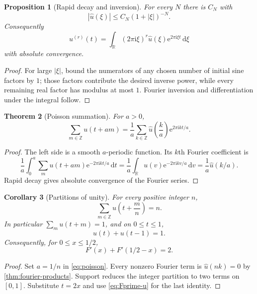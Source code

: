 \documentclass[11pt]{article}
\newtheorem{theorem}{Theorem}[section]
\newtheorem{proposition}[theorem]{Proposition}
\newtheorem{corollary}[theorem]{Corollary}
\theoremstyle{definition}
\theoremstyle{remark}
\newcommand{\R}{\mathbb R}\newcommand{\C}{\mathbb C}\newcommand{\Z}{\mathbb Z}
\newcommand{\dd}{\,\mathrm d}\newcommand{\e}{\mathrm e}\newcommand{\ii}{\mathrm i}
\begin{document}
\begin{proposition}[Rapid decay and inversion]\label{prop:rapid-decay}
For every $N$ there is $C_N$ with
\[
 |\widehat u(\xi)|\le C_N(1+|\xi|)^{-N}.
\]
Consequently
\begin{equation}\label{eq:fourier-inversion}
 u^{(r)}(t)=\int_{\R}(2\pi\ii\xi)^r\widehat u(\xi)
 \e^{2\pi\ii\xi t}\dd\xi
\end{equation}
with absolute convergence.
\end{proposition}
\begin{proof}
For large $|\xi|$, bound the numerators of any chosen number of initial sine factors by $1$; those factors contribute the desired inverse power, while every remaining real factor has modulus at most $1$.  Fourier inversion and differentiation under the integral follow.
\end{proof}

\begin{theorem}[Poisson summation]\label{thm:poisson}
For $a>0$,
\begin{equation}\label{eq:poisson}
 \sum_{m\in\Z}u(t+am)=\frac1a\sum_{k\in\Z}
 \widehat u\!\left(\frac{k}{a}\right)\e^{2\pi\ii kt/a}.
\end{equation}
\end{theorem}
\begin{proof}
The left side is a smooth $a$-periodic function.  Its $k$th Fourier coefficient is
\[
 \frac1a\int_0^a\sum_m u(t+am)\e^{-2\pi\ii kt/a}\dd t
 =\frac1a\int_{\R}u(v)\e^{-2\pi\ii kv/a}\dd v
 =\frac1a\widehat u(k/a).
\]
Rapid decay gives absolute convergence of the Fourier series.
\end{proof}

\begin{corollary}[Partitions of unity]\label{cor:partition}
For every positive integer $n$,
\begin{equation}\label{eq:fine-partition}
 \sum_{m\in\Z}u\!\left(t+\frac mn\right)=n.
\end{equation}
In particular $\sum_m u(t+m)=1$, and on $0\le t\le1$,
\begin{equation}\label{eq:two-term-partition}
 u(t)+u(t-1)=1.
\end{equation}
Consequently, for $0\le x\le1/2$,
\[
 F'(x)+F'(1/2-x)=2.
\]
\end{corollary}
\begin{proof}
Set $a=1/n$ in \eqref{eq:poisson}.  Every nonzero Fourier term is $\widehat u(nk)=0$ by \cref{thm:fourier-products}.  Support reduces the integer partition to two terms on $[0,1]$.  Substitute $t=2x$ and use \eqref{eq:Fprime-u} for the last identity.
\end{proof}
\end{document}
